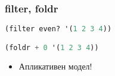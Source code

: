 \documentclass{beamer}
\begin{document}
\begin{frame}[fragile]
\frametitle{filter, foldr}

\begin{lstlisting}[language=Lisp]
(filter even? '(1 2 3 4))

(foldr + 0 '(1 2 3 4))
\end{lstlisting}

\begin{itemize}
  \item Апликативен модел!
\end{itemize}

\end{frame}





\end{document}
